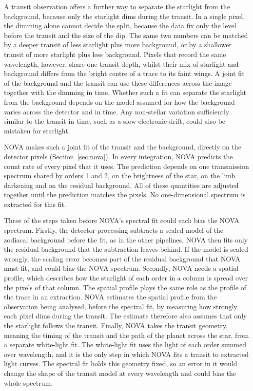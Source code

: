 A transit observation offers a further way to separate the starlight from the
background, because only the starlight dims during the transit. In a single
pixel, the dimming alone cannot decide the split, because the data fix only
the level before the transit and the size of the dip. The same two numbers
can be matched by a deeper transit of less starlight plus more background, or
by a shallower transit of more starlight plus less background. Pixels that
record the same wavelength, however, share one transit depth, whilst their
mix of starlight and background differs from the bright centre of a trace to
its faint wings. A joint fit of the background and the transit can use these
differences across the image together with the dimming in time. Whether such
a fit can separate the starlight from the background depends on the model
assumed for how the background varies across the detector and in time. Any
non-stellar variation sufficiently similar to the transit in time, such as a
slow electronic drift, could also be mistaken for starlight. 

NOVA makes such a joint fit of the transit and the background, directly on
the detector pixels (Section~\ref{sec:nova}). In every integration, NOVA
predicts the count rate of every pixel that it uses. The prediction depends
on one transmission spectrum shared by orders 1 and 2, on the brightness of
the star, on the limb darkening and on the residual background. All of these
quantities are adjusted together until the prediction matches the pixels. No
one-dimensional spectrum is extracted for this fit.

Three of the steps taken before NOVA's spectral fit could each bias the NOVA spectrum. Firstly, the detector processing subtracts a
scaled model of the zodiacal background before the fit, as in the other
pipelines. NOVA then fits only the residual background that the subtraction
leaves behind. If the model is scaled wrongly, the scaling error becomes part
of the residual background that NOVA must fit, and could bias the NOVA
spectrum. Secondly, NOVA needs a spatial profile, which describes how the
starlight of each order in a column is spread over the pixels of that column.
The spatial profile plays the same role as the profile of the trace in an
extraction. NOVA estimates the spatial profile from the observation being analysed,
before the spectral fit, by measuring how strongly each pixel dims during the
transit. The estimate therefore also assumes that only the starlight follows
the transit. Finally, NOVA takes the transit geometry, meaning the timing of
the transit and the path of the planet across the star, from a separate
white-light fit. The white-light fit uses the light of each order summed over
wavelength, and it is the only step in which NOVA fits a transit to extracted light curves. The spectral fit holds this geometry fixed, so an error in it would change the shape of the transit model at every wavelength and could bias the whole spectrum.

